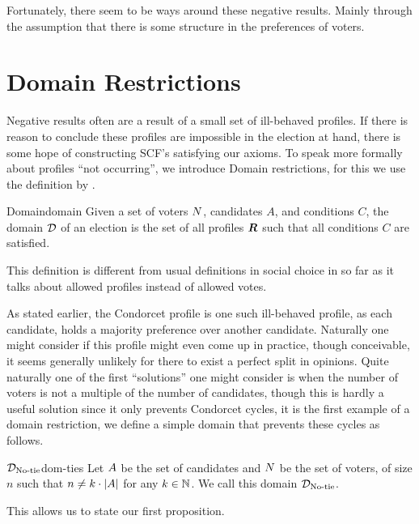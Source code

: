 Fortunately, there seem to be ways around these negative results. Mainly
through the assumption that there is some structure in the preferences of
voters.

\section{Domain Restrictions} \label{sec:Domain-res}

Negative results often are a result of a small set of ill-behaved profiles. If there is
reason to conclude these profiles are impossible in the election at hand, there
is some hope of constructing SCF's satisfying our axioms. To speak more
formally about profiles ``not occurring'', we introduce Domain restrictions, for
this we use the definition by
\citet{elkindPreferenceRestrictionsComputational2022}.

\begin{definition}{Domain}{domain}
	{
		Given a set of voters $N$, candidates $A$, and conditions $C$, the domain $\mathcal{D}_{\textnormal{}}$ of an election is the set of all profiles $\boldsymbol{R}$ such that all conditions $C$ are satisfied.
	}
\end{definition}

This definition is different from usual definitions in social choice in so far as it talks about allowed profiles instead of allowed votes.

As stated earlier, the Condorcet profile is one such ill-behaved profile, as
each candidate, holds a majority preference over another candidate.
Naturally one might consider if this profile might even come up in practice,
though conceivable, it seems generally unlikely for there to exist a perfect
split in opinions. Quite naturally one of the first ``solutions'' one might
consider is when the number of voters is not a multiple of the number of
candidates, though this is hardly a useful solution since it only prevents
Condorcet cycles, it is the first example of a domain restriction, we define a
simple domain that prevents these cycles as follows.

\begin{definition}{$\mathcal{D}_{\textnormal{No-tie}}$}{dom-ties}
	Let $A$ be the set of candidates and $N$ be the set of voters, of size $n$ such that $n \neq k \cdot |A|$ for any $k \in \mathbb{N}$. We call this domain $\mathcal{D}_{\textnormal{No-tie}}$.
\end{definition}

This allows us to state our first proposition.

